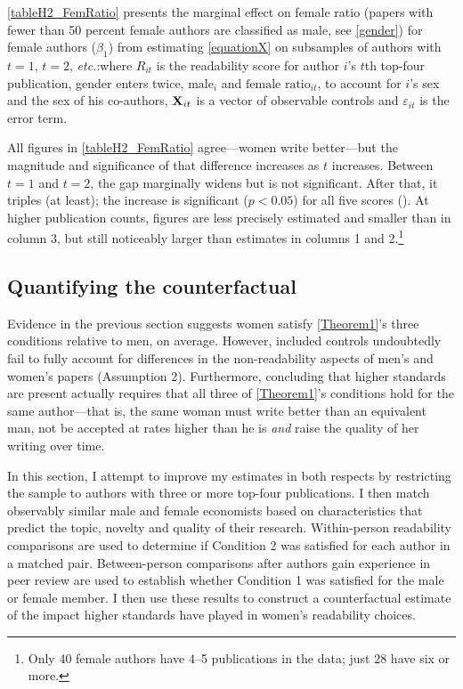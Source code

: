 \autoref{tableH2_FemRatio} presents the marginal effect on female ratio (papers with fewer than 50 percent female authors are classified as male, see \autoref{gender}) for female authors ($\beta_1$) from estimating \autoref{equationX} on subsamples of authors with $t=1$, $t=2$, \emph{etc.}:where $R_{it}$ is the readability score for author $i$'s $t$th top-four publication, gender enters twice, $\text{male}_i$ and $\text{female ratio}_{it}$, to account for $i$'s sex and the sex of his co-authors, $\mathbf{X}_{it}$ is a vector of observable controls and $\varepsilon_{it}$ is the error term.



All figures in \autoref{tableH2_FemRatio} agree---women write better---but the magnitude and significance of that difference increases as $t$ increases. Between $t=1$ and $t=2$, the gap marginally widens but is not significant. After that, it triples (at least); the increase is significant ($p<0.05$) for all five scores (). At higher publication counts, figures are less precisely estimated and smaller than in column 3, but still noticeably larger than estimates in columns 1 and 2.\footnote{Only 40 female authors have 4--5 publications in the data; just 28 have six or more.}

\subsection{Quantifying the counterfactual}
\label{quantification}

Evidence in the previous section suggests women satisfy \autoref{Theorem1}'s three conditions relative to men, on average. However, included controls undoubtedly fail to fully account for differences in the non-readability aspects of men's and women's papers (Assumption 2). Furthermore, concluding that higher standards are present actually requires that all three of \autoref{Theorem1}'s conditions hold for the same author---that is, the same woman must write better than an equivalent man, not be accepted at rates higher than he is \emph{and} raise the quality of her writing over time.

In this section, I attempt to improve my estimates in both respects by restricting the sample to authors with three or more top-four publications. I then match observably similar male and female economists based on characteristics that predict the topic, novelty and quality of their research. Within-person readability comparisons are used to determine if Condition 2 was satisfied for each author in a matched pair. Between-person comparisons after authors gain experience in peer review are used to establish whether Condition 1 was satisfied for the male or female member. I then use these results to construct a counterfactual estimate of the impact higher standards have played in women's readability choices.

